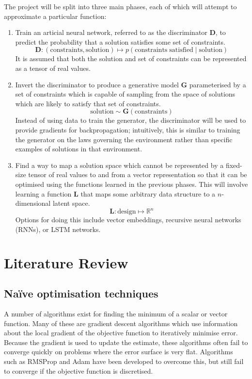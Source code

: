 \documentclass[a4paper]{article}
\begin{document}
The project will be split into three main phases, each of which will attempt to approximate a particular function:
\begin{enumerate}
  \item Train an articial neural network, referred to as the discriminator \textbf{D}, to predict the probability that a solution satisfies some set of constraints.
  $$\mathrm{\textbf{D}} : (\mathrm{constraints}, \mathrm{solution}) \mapsto p(\mathrm{constraints \; satisfied} \; | \; \mathrm{solution})$$
  It is assumed that both the solution and set of constraints can be represented as a tensor of real values.
  \item Invert the discriminator to produce a generative model \textbf{G} parameterised by a set of constraints
  which is capable of sampling from the space of solutions which are likely to satisfy that set of constraints.
  $$\mathrm{solution} \sim \mathrm{\textbf{G}}(\mathrm{constraints}) $$
  Instead of using data to train the generator, the discriminator will be used to provide gradients for backpropagation;
  intuitively, this is similar to training the generator on the laws governing the environment rather than specific examples of solutions in that environment.
  \item Find a way to map a solution space which cannot be represented by a fixed-size tensor of real values to and from a vector representation
  so that it can be optimised using the functions learned in the previous phases.
  This will involve learning a function \textbf{L} that maps some arbitrary data structure to a $n$-dimensional latent space.
  $$\mathrm{\textbf{L}} : \mathrm{design} \mapsto \mathbb{R}^n$$
  Options for doing this include vector embeddings, recursive neural networks (RNNs), or LSTM networks.

\end{enumerate}

\section{Literature Review}

\subsection{Na\"{i}ve optimisation techniques}

A number of algorithms exist for finding the minimum of a scalar or vector function.
Many of these are gradient descent algorithms \cite{ruder17} which use information about the local gradient of the objective function
to iteratively minimise error.
Because the gradient is used to update the estimate, these algorithms often fail to converge quickly on problems where the error surface is very flat.
Algorithms such as RMSProp \cite{hinton17} and Adam \cite{kingma17} have been developed to overcome this, but still fail to converge if the objective function is discretised.
\end{document}
